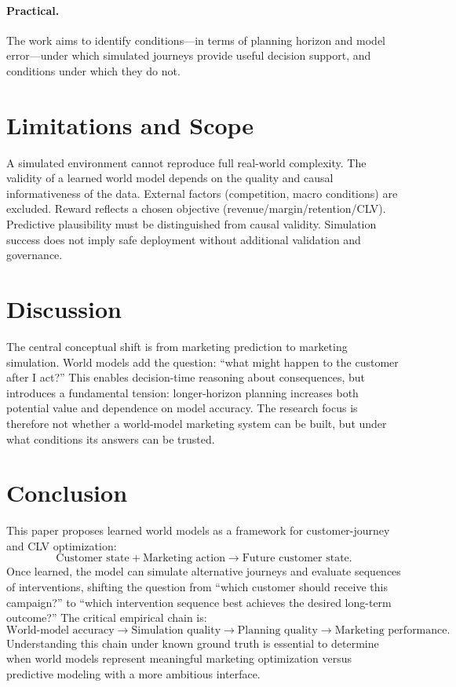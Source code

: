 \documentclass[11pt]{article}
\begin{document}
\paragraph{Practical.} The work aims to identify conditions---in terms of planning horizon and model error---under which simulated journeys provide useful decision support, and conditions under which they do not.

\section{Limitations and Scope}
A simulated environment cannot reproduce full real-world complexity. The validity of a learned world model depends on the quality and causal informativeness of the data. External factors (competition, macro conditions) are excluded. Reward reflects a chosen objective (revenue/margin/retention/CLV). Predictive plausibility must be distinguished from causal validity. Simulation success does not imply safe deployment without additional validation and governance.

\section{Discussion}
The central conceptual shift is from marketing prediction to marketing simulation. World models add the question: ``what might happen to the customer after I act?'' This enables decision-time reasoning about consequences, but introduces a fundamental tension: longer-horizon planning increases both potential value and dependence on model accuracy. The research focus is therefore not whether a world-model marketing system can be built, but under what conditions its answers can be trusted.

\section{Conclusion}
This paper proposes learned world models as a framework for customer-journey and CLV optimization:
\[
\text{Customer state} + \text{Marketing action} \rightarrow \text{Future customer state}.
\]
Once learned, the model can simulate alternative journeys and evaluate sequences of interventions, shifting the question from ``which customer should receive this campaign?'' to ``which intervention sequence best achieves the desired long-term outcome?'' The critical empirical chain is:
\[
\text{World-model accuracy} \rightarrow \text{Simulation quality} \rightarrow \text{Planning quality} \rightarrow \text{Marketing performance}.
\]
Understanding this chain under known ground truth is essential to determine when world models represent meaningful marketing optimization versus predictive modeling with a more ambitious interface.



\end{document}
